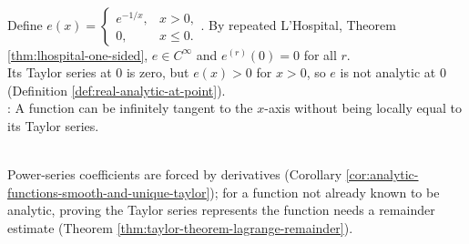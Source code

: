 \begin{example} \label{ex:smooth-flat-nonanalytic-function} \\
Define $e(x)=
\begin{cases}
e^{-1/x},&x>0,\\
0,&x\leq0.
\end{cases}$.
By repeated L'Hospital, Theorem \ref{thm:lhospital-one-sided}, $e\in C^\infty$ and $e^{(r)}(0)=0$ for all $r$.\\
Its Taylor series at $0$ is zero, but $e(x)>0$ for $x>0$, so $e$ is not analytic at $0$ (Definition \ref{def:real-analytic-at-point}).\\
: A function can be infinitely tangent to the $x$-axis without being locally equal to its Taylor series.
\end{example}

\begin{perspective} \label{per:taylor-coefficients-need-a-remainder} \\
Power-series coefficients are forced by derivatives (Corollary \ref{cor:analytic-functions-smooth-and-unique-taylor}); for a function not already known to be analytic, proving the Taylor series represents the function needs a remainder estimate (Theorem \ref{thm:taylor-theorem-lagrange-remainder}).
\end{perspective}


